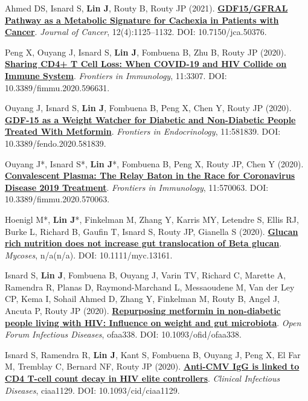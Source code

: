 \documentclass[letterpaper,11pt]{article}
\newcounter{journalCounter}
\newcommand{\jref}{%
    \stepcounter{journalCounter}%
    \textbf{[J.\thejournalCounter]}%
}
\begin{document}
\item[\jref] Ahmed DS, Isnard S, \textbf{Lin J}, Routy B, Routy JP (2021). \href{https://doi.org/10.7150/jca.50376}{\textbf{GDF15/GFRAL Pathway as a Metabolic Signature for Cachexia in Patients with Cancer}}. \textit{Journal of Cancer}, 12(4):1125–1132. DOI: 10.7150/jca.50376.

\item[\jref] Peng X, Ouyang J, Isnard S, \textbf{Lin J}, Fombuena B, Zhu B, Routy JP (2020). \href{https://doi.org/10.3389/fimmu.2020.596631}{\textbf{Sharing CD4+ T Cell Loss: When COVID-19 and HIV Collide on Immune System}}. \textit{Frontiers in Immunology}, 11:3307. DOI: 10.3389/fimmu.2020.596631.

\item[\jref] Ouyang J, Isnard S, \textbf{Lin J}, Fombuena B, Peng X, Chen Y, Routy JP (2020). \href{https://doi.org/10.3389/fendo.2020.581839}{\textbf{GDF-15 as a Weight Watcher for Diabetic and Non-Diabetic People Treated With Metformin}}. \textit{Frontiers in Endocrinology}, 11:581839. DOI: 10.3389/fendo.2020.581839.

\item[\jref] Ouyang J*, Isnard S*, \textbf{Lin J}*, Fombuena B, Peng X, Routy JP, Chen Y (2020). \href{https://doi.org/10.3389/fimmu.2020.570063}{\textbf{Convalescent Plasma: The Relay Baton in the Race for Coronavirus Disease 2019 Treatment}}. \textit{Frontiers in Immunology}, 11:570063. DOI: 10.3389/fimmu.2020.570063.

\item[\jref] Hoenigl M*, \textbf{Lin J}*, Finkelman M, Zhang Y, Karris MY, Letendre S, Ellis RJ, Burke L, Richard B, Gaufin T, Isnard S, Routy JP, Gianella S (2020). \href{https://doi.org/10.1111/myc.13161}{\textbf{Glucan rich nutrition does not increase gut translocation of Beta glucan}}. \textit{Mycoses}, n/a(n/a). DOI: 10.1111/myc.13161.

\item[\jref] Isnard S, \textbf{Lin J}, Fombuena B, Ouyang J, Varin TV, Richard C, Marette A, Ramendra R, Planas D, Raymond-Marchand L, Messaoudene M, Van der Ley CP, Kema I, Sohail Ahmed D, Zhang Y, Finkelman M, Routy B, Angel J, Ancuta P, Routy JP (2020). \href{https://doi.org/10.1093/ofid/ofaa338}{\textbf{Repurposing metformin in non-diabetic people living with HIV: Influence on weight and gut microbiota}}. \textit{Open Forum Infectious Diseases}, ofaa338. DOI: 10.1093/ofid/ofaa338.

\item[\jref] Isnard S, Ramendra R, \textbf{Lin J}, Kant S, Fombuena B, Ouyang J, Peng X, El Far M, Tremblay C, Bernard NF, Routy JP (2020). \href{https://doi.org/10.1093/cid/ciaa1129}{\textbf{Anti-CMV IgG is linked to CD4 T-cell count decay in HIV elite controllers}}. \textit{Clinical Infectious Diseases}, ciaa1129. DOI: 10.1093/cid/ciaa1129.
\end{document}
